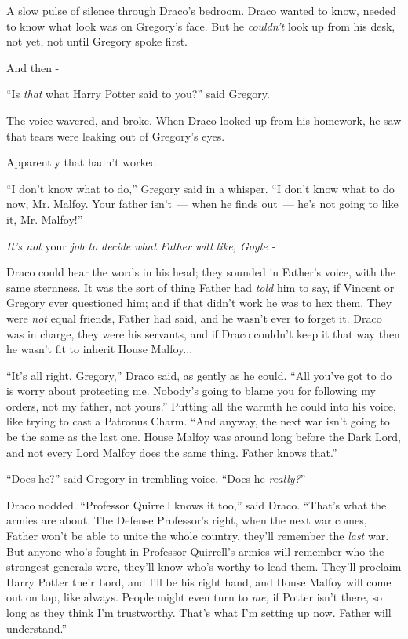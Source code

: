 A slow pulse of silence through Draco's bedroom. Draco wanted to know, needed to know what look was on Gregory's face. But he \emph{couldn't} look up from his desk, not yet, not until Gregory spoke first.

And then -

``Is \emph{that} what Harry Potter said to you?'' said Gregory.

The voice wavered, and broke. When Draco looked up from his homework, he saw that tears were leaking out of Gregory's eyes.

Apparently that hadn't worked.

``I don't know what to do,'' Gregory said in a whisper. ``I don't know what to do now, Mr. Malfoy. Your father isn't~--- when he finds out~--- he's not going to like it, Mr. Malfoy!''

\emph{It's not} your \emph{job to decide what Father will like, Goyle -}

Draco could hear the words in his head; they sounded in Father's voice, with the same sternness. It was the sort of thing Father had \emph{told} him to say, if Vincent or Gregory ever questioned him; and if that didn't work he was to hex them. They were \emph{not} equal friends, Father had said, and he wasn't ever to forget it. Draco was in charge, they were his servants, and if Draco couldn't keep it that way then he wasn't fit to inherit House Malfoy...

``It's all right, Gregory,'' Draco said, as gently as he could. ``All you've got to do is worry about protecting me. Nobody's going to blame you for following my orders, not my father, not yours.'' Putting all the warmth he could into his voice, like trying to cast a Patronus Charm. ``And anyway, the next war isn't going to be the same as the last one. House Malfoy was around long before the Dark Lord, and not every Lord Malfoy does the same thing. Father knows that.''

``Does he?'' said Gregory in trembling voice. ``Does he \emph{really?}''

Draco nodded. ``Professor Quirrell knows it too,'' said Draco. ``That's what the armies are about. The Defense Professor's right, when the next war comes, Father won't be able to unite the whole country, they'll remember the \emph{last} war. But anyone who's fought in Professor Quirrell's armies will remember who the strongest generals were, they'll know who's worthy to lead them. They'll proclaim Harry Potter their Lord, and I'll be his right hand, and House Malfoy will come out on top, like always. People might even turn to \emph{me,} if Potter isn't there, so long as they think I'm trustworthy. That's what I'm setting up now. Father will understand.''

